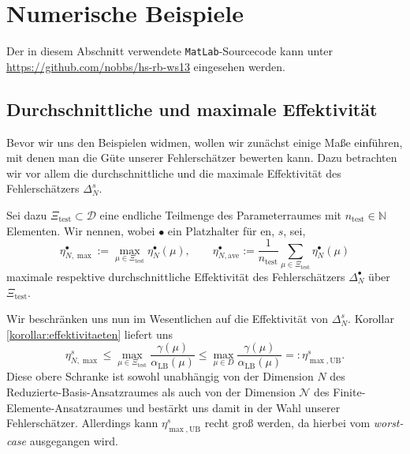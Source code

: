 
\section{Numerische Beispiele} %
\label{sec:beispiel}

Der in diesem Abschnitt verwendete \texttt{MatLab}-Sourcecode kann unter \url{https://github.com/nobbs/hs-rb-ws13} eingesehen werden.

\subsection{Durchschnittliche und maximale Effektivität} %
\label{sub:durchschnittliche_und_maximale_effektivitaet}

Bevor wir uns den Beispielen widmen, wollen wir zunächst einige Maße einführen, mit denen man die Güte unserer Fehlerschätzer bewerten kann.
Dazu betrachten wir vor allem die durchschnittliche und die maximale Effektivität des Fehlerschätzers $\Delta^s_N$.

Sei dazu $\Xi_{\text{test}} \subset \mathcal D$ eine endliche Teilmenge des Parameterraumes mit $n_\text{test} \in \mathbb{N}$ Elementen.
Wir nennen, wobei $\bullet$ ein Platzhalter für \glqq{}$\text{en}$\grqq{}, \glqq{}$s$\grqq{}, \glqq{} \grqq{} sei,
\begin{equation}
    \eta^\bullet_{N,\max} := \max_{\mu \in \Xi_\text{test}} \eta^\bullet_N(\mu), \qquad
    \eta^\bullet_{N,\text{ave}} := \frac{1}{n_\text{test}} \sum_{\mu \in \Xi_\text{test}} \eta^\bullet_N(\mu)
\end{equation}
maximale respektive durchschnittliche Effektivität des Fehlerschätzers $\Delta^\bullet_N$ über $\Xi_\text{test}$.

Wir beschränken uns nun im Wesentlichen auf die Effektivität von $\Delta^s_N$. Korollar \ref{korollar:effektivitaeten} liefert uns
\begin{equation}
    \eta^s_{N,\max} \leq \max_{\mu \in \Xi_\text{test}} \frac{\gamma(\mu)}{\alpha_{\text{LB}}(\mu)} \leq \max_{\mu \in D} \frac{\gamma(\mu)}{\alpha_{\text{LB}}(\mu)} =: \eta^s_{\max,\text{UB}}.
\end{equation}
Diese obere Schranke ist sowohl unabhängig von der Dimension $N$ des Reduzierte-Basis-Ansatzraumes als auch von der Dimension $\mathcal N$ des Finite-Elemente-Ansatzraumes und bestärkt uns damit in der Wahl unserer Fehlerschätzer. Allerdings kann $\eta^s_{\max,\text{UB}}$ recht groß werden, da hierbei vom \emph{worst-case} ausgegangen wird.

